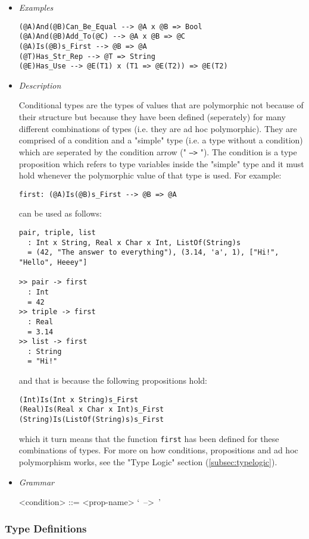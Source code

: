 \documentclass{article}
\begin{document}
\begin{itemize}
\item \textit{Examples}
\begin{verbatim}
(@A)And(@B)Can_Be_Equal --> @A x @B => Bool
(@A)And(@B)Add_To(@C) --> @A x @B => @C
(@A)Is(@B)s_First --> @B => @A
(@T)Has_Str_Rep --> @T => String
(@E)Has_Use --> @E(T1) x (T1 => @E(T2)) => @E(T2)
\end{verbatim}

\item \textit{Description}

Conditional types are the types of values that are polymorphic not because of
their structure but because they have been defined (seperately) for many
different combinations of types (i.e. they are ad hoc polymorphic). They are
comprised of a condition and a "simple" type (i.e. a type without a condition)
which are seperated by the condition arrow (" \texttt{-->} "). The condition is a
type proposition which refers to type variables inside the "simple" type and it
must hold whenever the polymorphic value of that type is used. For example:
\begin{verbatim}
first: (@A)Is(@B)s_First --> @B => @A
\end{verbatim}
can be used as follows:
\begin{verbatim}
pair, triple, list
  : Int x String, Real x Char x Int, ListOf(String)s
  = (42, "The answer to everything"), (3.14, 'a', 1), ["Hi!", "Hello", Heeey"]

>> pair -> first
  : Int
  = 42
>> triple -> first
  : Real
  = 3.14
>> list -> first
  : String
  = "Hi!"
\end{verbatim}
and that is because the following propositions hold:
\begin{verbatim}
(Int)Is(Int x String)s_First
(Real)Is(Real x Char x Int)s_First
(String)Is(ListOf(String)s)s_First
\end{verbatim}
which it turn means that the function \texttt{first} has been defined
for these combinations of types. For more on how conditions, propositions and
ad hoc polymorphism works, see the "Type Logic" section (\ref{subsec:typelogic}).

\item \textit{Grammar}
\begin{grammar}
<condition> ::= <prop-name> `\ -->\ ' 
\end{grammar}

\end{itemize}

\subsubsection{Type Definitions}
\label{subsubsec:tdefs}
\end{document}
